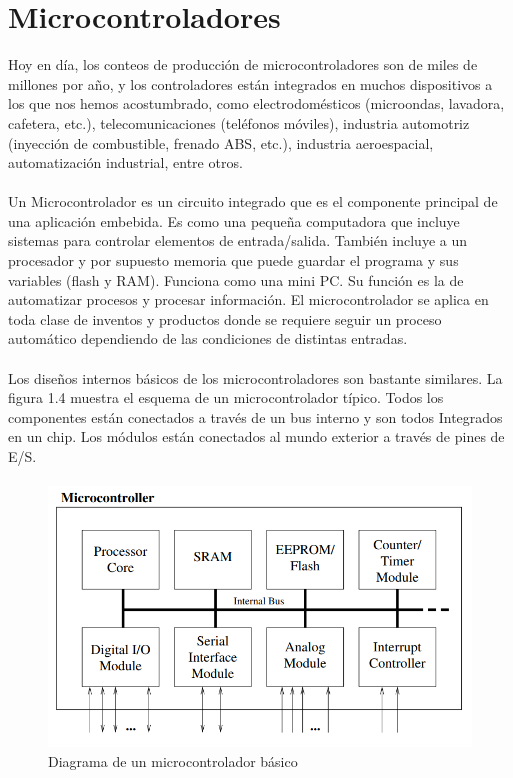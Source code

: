 \section{Microcontroladores}
Hoy en día, los conteos de producción de microcontroladores son de miles de millones por año, y los controladores están integrados en muchos dispositivos a los que nos hemos acostumbrado, como electrodomésticos (microondas, lavadora, cafetera, etc.), telecomunicaciones (teléfonos móviles), industria automotriz (inyección de combustible, frenado ABS, etc.), industria aeroespacial, automatización industrial, entre otros.
\paragraph{}
Un Microcontrolador es un circuito integrado que es el componente principal de una aplicación embebida. Es como una pequeña computadora que incluye sistemas para controlar elementos de entrada/salida. También incluye a un procesador y por supuesto memoria que puede guardar el programa y sus variables (flash y RAM).  Funciona como una mini PC. Su función es la de automatizar procesos y procesar información.
El microcontrolador se aplica en toda clase de inventos y productos donde se requiere seguir un proceso automático dependiendo de las condiciones de distintas entradas.
\paragraph{}
Los diseños internos básicos de los microcontroladores son bastante similares. La figura 1.4 muestra el esquema de un microcontrolador típico. Todos los componentes están conectados a través de un bus interno y son todos Integrados en un chip. Los módulos están conectados al mundo exterior a través de pines de E/S.
\paragraph{}
\begin{figure}[H]
	\centering
	\includegraphics[scale=.9]{Capitulo2/images/microcontrolador.png}
	\caption{Diagrama de un microcontrolador básico}
	\label{fig:diagrama_dispMonitoreo}
\end{figure}
